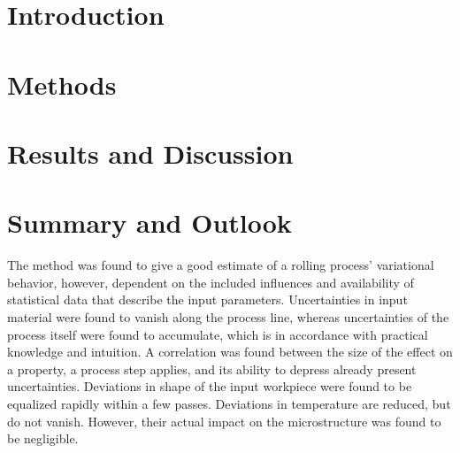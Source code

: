\documentclass[DIV=13]{scrartcl}
\begin{document}
\maketitle

\begin{abstract}
    Industrial processes are subject to uncertainties originating in variations of input material and process parameters,
    especially if manual treatment is involved.
    For hot rolling processes, in particular,
    variations in workpiece geometry and temperature are affecting the final product shape and material properties.
    In this work, a Monte-Carlo-Method is applied to a fast hot rolling model based on the open-source rolling simulation framework PyRolL for estimating and analyzing the variational behavior of an experimental semi-continuous rolling line for steel wire production.
    The effects of input tolerances and manual transport between the reversing passes on the final product properties are quantified.
    Crucial stages of the process in regard to product properties are identified.
    The findings are compared with practical knowledge and experimental results of statistical rolling trials.
\end{abstract}

\pagewiselinenumbers

\section{Introduction}\label{sec:introduction}



\section{Methods}\label{sec:methods}



\section{Results and Discussion}\label{sec:results}



\section{Summary and Outlook}\label{sec:summary}

The method was found to give a good estimate of a rolling process' variational behavior, however, dependent on the included influences and availability of statistical data that describe the input parameters.
Uncertainties in input material were found to vanish along the process line, whereas uncertainties of the process itself were found to accumulate, which is in accordance with practical knowledge and intuition.
A correlation was found between the size of the effect on a property, a process step applies, and its ability to depress already present uncertainties.
Deviations in shape of the input workpiece were found to be equalized rapidly within a few passes.
Deviations in temperature are reduced, but do not vanish.
However, their actual impact on the microstructure was found to be negligible.
\end{document}
